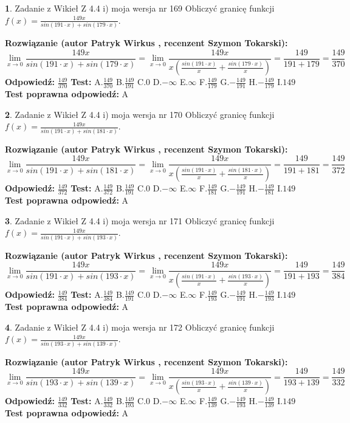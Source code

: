 \documentclass[12pt, a4paper]{article}
\theoremstyle{definition} %
\newtheorem{zad}{}
\newcommand{\zadStart}[1]{\begin{zad}#1\newline}
\newcommand{\zadStop}{\end{zad}}
\newcommand{\rozwStart}[2]{\noindent \textbf{Rozwiązanie (autor #1 , recenzent #2): }\newline}
\newcommand{\rozwStop}{\newline}
\newcommand{\odpStart}{\noindent \textbf{Odpowiedź:}\newline}
\newcommand{\odpStop}{\newline}
\newcommand{\testStart}{\noindent \textbf{Test:}\newline}
\newcommand{\testStop}{\newline}
\newcommand{\kluczStart}{\noindent \textbf{Test poprawna odpowiedź:}\newline}
\newcommand{\kluczStop}{\newline}
\begin{document}
\zadStart{Zadanie z Wikieł Z 4.4 i) moja wersja nr 169}
Obliczyć granicę funkcji $f(x)=\frac{149x}{sin(191\cdot x) +sin(179\cdot x)}$.
\zadStop
\rozwStart{Patryk Wirkus}{Szymon Tokarski}
$$\lim\limits_{x\to 0}\frac{149x}{sin(191\cdot x) +sin(179\cdot x)}=\lim\limits_{x\to 0}\frac{149x}{x(\frac{sin(191\cdot x)}{x}+\frac{sin(179\cdot x)}{x})}=\frac{149}{191+179} = \frac{149}{370}$$
\rozwStop
\odpStart
$\frac{149}{370}$
\odpStop
\testStart
A.$\frac{149}{370}$
B.$\frac{149}{191}$
C.$0$
D.$-\infty$
E.$\infty$
F.$\frac{149}{179}$
G.$-\frac{149}{191}$
H.$-\frac{149}{179}$
I.$149$
\testStop
\kluczStart
A
\kluczStop



\zadStart{Zadanie z Wikieł Z 4.4 i) moja wersja nr 170}
Obliczyć granicę funkcji $f(x)=\frac{149x}{sin(191\cdot x) +sin(181\cdot x)}$.
\zadStop
\rozwStart{Patryk Wirkus}{Szymon Tokarski}
$$\lim\limits_{x\to 0}\frac{149x}{sin(191\cdot x) +sin(181\cdot x)}=\lim\limits_{x\to 0}\frac{149x}{x(\frac{sin(191\cdot x)}{x}+\frac{sin(181\cdot x)}{x})}=\frac{149}{191+181} = \frac{149}{372}$$
\rozwStop
\odpStart
$\frac{149}{372}$
\odpStop
\testStart
A.$\frac{149}{372}$
B.$\frac{149}{191}$
C.$0$
D.$-\infty$
E.$\infty$
F.$\frac{149}{181}$
G.$-\frac{149}{191}$
H.$-\frac{149}{181}$
I.$149$
\testStop
\kluczStart
A
\kluczStop



\zadStart{Zadanie z Wikieł Z 4.4 i) moja wersja nr 171}
Obliczyć granicę funkcji $f(x)=\frac{149x}{sin(191\cdot x) +sin(193\cdot x)}$.
\zadStop
\rozwStart{Patryk Wirkus}{Szymon Tokarski}
$$\lim\limits_{x\to 0}\frac{149x}{sin(191\cdot x) +sin(193\cdot x)}=\lim\limits_{x\to 0}\frac{149x}{x(\frac{sin(191\cdot x)}{x}+\frac{sin(193\cdot x)}{x})}=\frac{149}{191+193} = \frac{149}{384}$$
\rozwStop
\odpStart
$\frac{149}{384}$
\odpStop
\testStart
A.$\frac{149}{384}$
B.$\frac{149}{191}$
C.$0$
D.$-\infty$
E.$\infty$
F.$\frac{149}{193}$
G.$-\frac{149}{191}$
H.$-\frac{149}{193}$
I.$149$
\testStop
\kluczStart
A
\kluczStop



\zadStart{Zadanie z Wikieł Z 4.4 i) moja wersja nr 172}
Obliczyć granicę funkcji $f(x)=\frac{149x}{sin(193\cdot x) +sin(139\cdot x)}$.
\zadStop
\rozwStart{Patryk Wirkus}{Szymon Tokarski}
$$\lim\limits_{x\to 0}\frac{149x}{sin(193\cdot x) +sin(139\cdot x)}=\lim\limits_{x\to 0}\frac{149x}{x(\frac{sin(193\cdot x)}{x}+\frac{sin(139\cdot x)}{x})}=\frac{149}{193+139} = \frac{149}{332}$$
\rozwStop
\odpStart
$\frac{149}{332}$
\odpStop
\testStart
A.$\frac{149}{332}$
B.$\frac{149}{193}$
C.$0$
D.$-\infty$
E.$\infty$
F.$\frac{149}{139}$
G.$-\frac{149}{193}$
H.$-\frac{149}{139}$
I.$149$
\testStop
\kluczStart
A
\kluczStop
\end{document}

